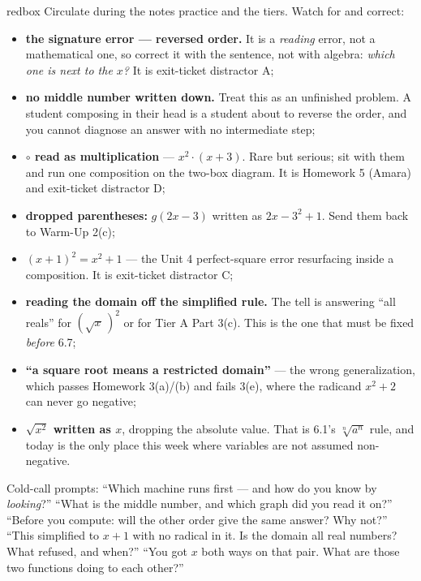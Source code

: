 \documentclass[10pt]{article}
\begin{document}
\begin{skillbox}{redbox}
Circulate during the notes practice and the tiers. Watch for and correct:
\begin{itemize}[leftmargin=1.2em, nosep]
  \item \textbf{the signature error --- reversed order.} It is a \emph{reading} error, not a mathematical one, so correct it with the sentence, not with algebra: \emph{which one is next to the $x$?} It is exit-ticket distractor A;
  \item \textbf{no middle number written down.} Treat this as an unfinished problem. A student composing in their head is a student about to reverse the order, and you cannot diagnose an answer with no intermediate step;
  \item \textbf{$\circ$ read as multiplication} --- $x^{2}\cdot(x+3)$. Rare but serious; sit with them and run one composition on the two-box diagram. It is Homework 5 (Amara) and exit-ticket distractor D;
  \item \textbf{dropped parentheses:} $g(2x-3)$ written as $2x-3^{2}+1$. Send them back to Warm-Up 2(c);
  \item \textbf{$(x+1)^{2}=x^{2}+1$} --- the Unit 4 perfect-square error resurfacing inside a composition. It is exit-ticket distractor C;
  \item \textbf{reading the domain off the simplified rule.} The tell is answering ``all reals'' for $\left(\sqrt{x}\,\right)^{2}$ or for Tier A Part 3(c). This is the one that must be fixed \emph{before} 6.7;
  \item \textbf{``a square root means a restricted domain''} --- the wrong generalization, which passes Homework 3(a)/(b) and fails 3(e), where the radicand $x^{2}+2$ can never go negative;
  \item \textbf{$\sqrt{x^{2}}$ written as $x$}, dropping the absolute value. That is 6.1's $\sqrt[n]{a^{n}}$ rule, and today is the only place this week where variables are not assumed non-negative.
\end{itemize}
Cold-call prompts: ``Which machine runs first --- and how do you know by \emph{looking}?'' ``What is
the middle number, and which graph did you read it on?'' ``Before you compute: will the other order
give the same answer? Why not?'' ``This simplified to $x+1$ with no radical in it. Is the domain all
real numbers? What refused, and when?'' ``You got $x$ both ways on that pair. What are those two
functions doing to each other?''
\end{skillbox}
\end{document}
